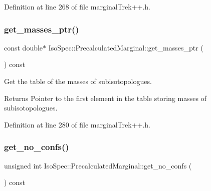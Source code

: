 Definition at line 268 of file marginal\+Trek++.\+h.

\mbox{\label{class_iso_spec_1_1_precalculated_marginal_a9a768b90299ea16c447a392dbe1123b5}} 
\subsubsection{\texorpdfstring{get\+\_\+masses\+\_\+ptr()}{get\_masses\_ptr()}}
{\footnotesize\ttfamily const double$\ast$ Iso\+Spec\+::\+Precalculated\+Marginal\+::get\+\_\+masses\+\_\+ptr (\begin{DoxyParamCaption}{ }\end{DoxyParamCaption}) const\hspace{0.3cm}{\ttfamily [inline]}}



Get the table of the masses of subisotopologues. 

\begin{DoxyReturn}{Returns}
Pointer to the first element in the table storing masses of subisotopologues. 
\end{DoxyReturn}


Definition at line 280 of file marginal\+Trek++.\+h.

\mbox{\label{class_iso_spec_1_1_precalculated_marginal_a0dbf1ec53eac9953a354c11e1b0803f9}} 
\subsubsection{\texorpdfstring{get\+\_\+no\+\_\+confs()}{get\_no\_confs()}}
{\footnotesize\ttfamily unsigned int Iso\+Spec\+::\+Precalculated\+Marginal\+::get\+\_\+no\+\_\+confs (\begin{DoxyParamCaption}{ }\end{DoxyParamCaption}) const\hspace{0.3cm}{\ttfamily [inline]}}



